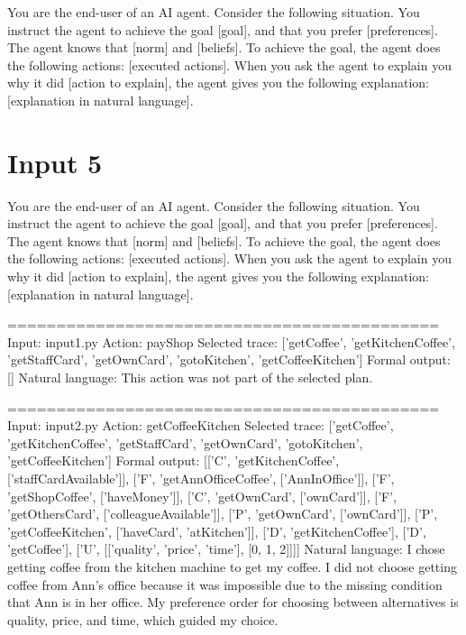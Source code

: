 \documentclass{article}
\begin{document}
You are the end-user of an AI agent. Consider the following situation. You instruct the
agent to achieve the goal [goal], and that you prefer [preferences]. The agent knows that
[norm] and [beliefs]. To achieve the goal, the agent does the following actions: [executed
actions]. When you ask the agent to explain you why it did [action to explain], the agent
gives you the following explanation:
[explanation in natural language].

\newpage

\section{Input 5}

You are the end-user of an AI agent. Consider the following situation. You instruct the
agent to achieve the goal [goal], and that you prefer [preferences]. The agent knows that
[norm] and [beliefs]. To achieve the goal, the agent does the following actions: [executed
actions]. When you ask the agent to explain you why it did [action to explain], the agent
gives you the following explanation:
[explanation in natural language].

\newpage

============================================
Input: input1.py
Action: payShop
Selected trace: ['getCoffee', 'getKitchenCoffee', 'getStaffCard', 'getOwnCard', 'gotoKitchen', 'getCoffeeKitchen']
Formal output: []
Natural language: This action was not part of the selected plan.

============================================
Input: input2.py
Action: getCoffeeKitchen
Selected trace: ['getCoffee', 'getKitchenCoffee', 'getStaffCard', 'getOwnCard', 'gotoKitchen', 'getCoffeeKitchen']
Formal output: [['C', 'getKitchenCoffee', ['staffCardAvailable']], ['F', 'getAnnOfficeCoffee', ['AnnInOffice']], ['F', 'getShopCoffee', ['haveMoney']], ['C', 'getOwnCard', ['ownCard']], ['F', 'getOthersCard', ['colleagueAvailable']], ['P', 'getOwnCard', ['ownCard']], ['P', 'getCoffeeKitchen', ['haveCard', 'atKitchen']], ['D', 'getKitchenCoffee'], ['D', 'getCoffee'], ['U', [['quality', 'price', 'time'], [0, 1, 2]]]]
Natural language: I chose getting coffee from the kitchen machine to get my coffee. I did not choose getting coffee from Ann's office because it was impossible due to the missing condition that Ann is in her office. My preference order for choosing between alternatives is quality, price, and time, which guided my choice. 
\end{document}

